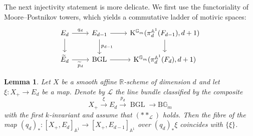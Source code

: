 \documentclass[11pt,leqno]{amsart}
\renewcommand{\1}{{\rm 1\hspace*{-0.4ex}%
\rule{0.1ex}{1.52ex}\hspace*{0.2ex}}}
\newcommand{\gm}[1]{{{\mathbb G}_{m}^{#1}}}
\newcommand{\Gm}{{\gm{}}}
\renewcommand{\Lc}{{\mathcal L}}
\newcommand{\<}[1]{{\langle}#1 {\rangle}}
\newcommand{\Rb}{\mathbb{R}}
\newcommand{\Kr}{\mathrm{K}}
\newcommand{\Abb}{\mathbb{A}}
\newcommand{\BGL}{\operatorname{BGL}}
\newcommand{\Br}{\mathrm{B}}
\theoremstyle{plain}
\newtheorem{lem}[thm]{Lemma}
\theoremstyle{definition}
\theoremstyle{remark}
\numberwithin{equation}{section}
\begin{document}
The next injectivity statement is more delicate. We first use the functoriality of Moore--Postnikov towers, which yields a commutative ladder of motivic spaces:
\begin{equation}\label{eq:morphism_of_moore_postnikov_towers}
\begin{tikzcd}
E_d \arrow[r,"q_d"] \arrow[d] & E_{d-1} \arrow[r] \arrow[d,"p_{d-1}"] & \Kr^{\Gm}(\pi_d^{\Abb^1}(F_{d-1}),d+1) \arrow[d] \\
\widetilde{E}_d \arrow[r,swap,"\widetilde{p}_d"] & \BGL \arrow[r] & \Kr^{\Gm}(\pi_d^{\Abb^1}(F_d),d+1)
\end{tikzcd}
\end{equation}

\begin{lem}\label{lem:corank_one_trivial_fibre_second_stage}
Let $X$ be a smooth affine $\Rb$-scheme of dimension $d$ and let $\xi:X_+\to E_d$ be a map. Denote by $\Lc$ the line bundle classified by the composite \[X_+\xrightarrow{\xi} E_d\xrightarrow{p_d}\BGL\to\Br\mathbb{G}_m\] with the first $k$-invariant and assume that $(**_\Lc)$ holds. Then the fibre of the map $(q_d)_*:[X_+,E_d]_{\Abb^1}\to[X_+,E_{d-1}]_{\Abb^1}$ over $(q_d)_*\xi$ coincides with $\{\xi\}$.
\end{lem}
\end{document}
